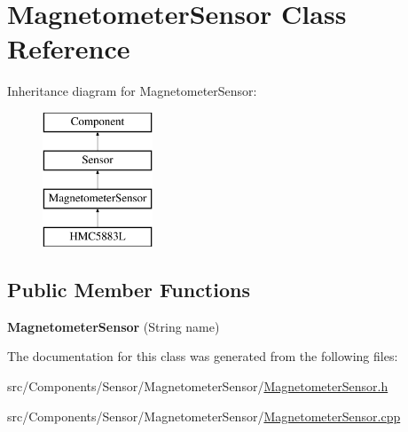 \hypertarget{classMagnetometerSensor}{}\section{Magnetometer\+Sensor Class Reference}
\label{classMagnetometerSensor}
Inheritance diagram for Magnetometer\+Sensor\+:\begin{figure}[H]
\begin{center}
\leavevmode
\includegraphics[height=4.000000cm]{classMagnetometerSensor}
\end{center}
\end{figure}
\subsection*{Public Member Functions}
\begin{DoxyCompactItemize}
\item 
\hypertarget{classMagnetometerSensor_a638465f24911a3a246e1e268f5159a2f}{}{\bfseries Magnetometer\+Sensor} (String name)\label{classMagnetometerSensor_a638465f24911a3a246e1e268f5159a2f}

\end{DoxyCompactItemize}


The documentation for this class was generated from the following files\+:\begin{DoxyCompactItemize}
\item 
src/\+Components/\+Sensor/\+Magnetometer\+Sensor/\hyperlink{MagnetometerSensor_8h}{Magnetometer\+Sensor.\+h}\item 
src/\+Components/\+Sensor/\+Magnetometer\+Sensor/\hyperlink{MagnetometerSensor_8cpp}{Magnetometer\+Sensor.\+cpp}\end{DoxyCompactItemize}
